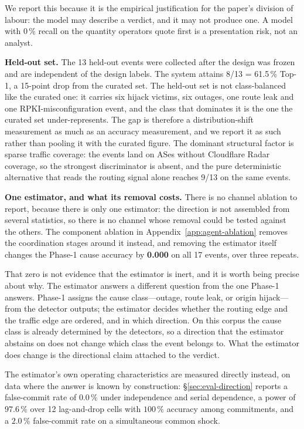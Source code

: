 We report this because it is the empirical justification for the paper's
division of labour: the model may describe a verdict, and it may not
produce one. A model with 0\,\% recall on the quantity operators quote
first is a presentation risk, not an analyst.

\textbf{Held-out set.} The 13 held-out events were collected after the
design was frozen and are independent of the design labels. The system
attains 8/13 = 61.5\,\% Top-1, a 15-point drop from the curated set. The
held-out set is not class-balanced like the curated one: it carries six
hijack victims, six outages, one route leak and one RPKI-misconfiguration
event, and the class that dominates it is the one the curated set
under-represents. The gap is therefore a distribution-shift measurement as
much as an accuracy measurement, and we report it as such rather than
pooling it with the curated figure. The dominant structural factor is
sparse traffic coverage: the events land on ASes without Cloudflare Radar
coverage, so the strongest discriminator is absent, and the pure
deterministic alternative that reads the routing signal alone reaches
9/13 on the same events.

\textbf{One estimator, and what its removal costs.} There is no channel
ablation to report, because there is only one estimator: the direction is
not assembled from several statistics, so there is no channel whose removal
could be tested against the others. The component ablation in
Appendix~\ref{app:agent-ablation} removes the coordination stages around it
instead,
and removing the estimator itself changes the Phase-1 cause accuracy by
\textbf{0.000} on all 17 events, over three repeats.

That zero is not evidence that the estimator is inert, and it is worth
being precise about why. The estimator answers a different question from
the one Phase-1 answers. Phase-1 assigns the cause class---outage, route
leak, or origin hijack---from the detector outputs; the estimator decides
whether the routing edge and the traffic edge are ordered, and in which
direction. On this corpus the cause class is already determined by the
detectors, so a direction that the estimator abstains on does not change
which class the event belongs to. What the estimator does change is the
directional claim attached to the verdict.

The estimator's own operating characteristics are measured directly
instead, on data where the answer is known by construction:
\S\ref{sec:eval-direction} reports a false-commit rate of $0.0\,\%$ under
independence and serial dependence, a power of $97.6\,\%$ over 12
lag-and-drop cells with $100\,\%$ accuracy among commitments, and a
$2.0\,\%$ false-commit rate on a simultaneous common shock.

